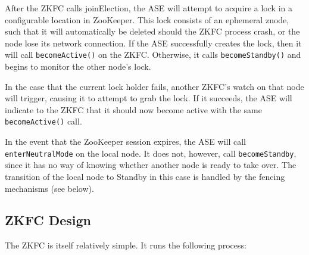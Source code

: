 \documentclass{article}
\begin{document}
After the ZKFC calls {{joinElection}}, the ASE will attempt to acquire a lock in a configurable location in ZooKeeper. This lock consists of an ephemeral znode, such that it will automatically be deleted should the ZKFC process crash, or the node lose its network connection. If the ASE successfully creates the lock, then it will call {\tt becomeActive()} on the ZKFC. Otherwise, it calls {\tt becomeStandby()} and begins to monitor the other node's lock.

In the case that the current lock holder fails, another ZKFC's watch on that node will trigger, causing it to attempt to grab the lock. If it succeeds, the ASE will indicate to the ZKFC that it should now become active with the same {\tt becomeActive()} call.

In the event that the ZooKeeper session expires, the ASE will call {\tt enterNeutralMode} on the local node. It does not, however, call {\tt becomeStandby}, since it has no way of knowing whether another node is ready to take over. The transition of the local node to Standby in this case is handled by the fencing mechanisms (see below).

\subsection{ZKFC Design}

The ZKFC is itself relatively simple. It runs the following process:
\end{document}
